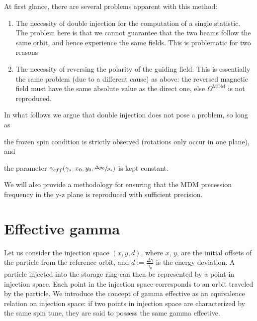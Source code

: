 \documentclass{article}
\newcommand{\W}{\Omega}
\newcommand{\MDM}{^\mathrm{MDM}}
\begin{document}
At first glance, there are several problems apparent with this method:
\begin{enumerate}
\item The necessity of double injection for the computation of a single statistic. The problem here is that we cannot guarantee that the two beams follow the same orbit, and hence experience the same fields. This is problematic for two reasons \label{itm:Injection}
  
  \item The necessity of reversing the polarity of the guiding field. This is essentially the same problem (due to a different cause) as above: the reversed magnetic field must have the same absolute value as the direct one, else $\W\MDM$ is not reproduced. \label{itm:Polarity}
\end{enumerate}

In what follows we argue that double injection does not pose a problem, so long as 
\begin{inparaenum}[a)]
\item the frozen spin condition is strictly observed (rotations only occur in one plane), and
\item the parameter $\gamma_{eff}(\gamma_s, x_0, y_0, \sfrac{\Delta p_0}{p_s})$ is kept constant.
\end{inparaenum}
We will also provide a methodology for ensuring that the MDM precession frequency in the y-z plane is reproduced with sufficient precision.

\section{Effective gamma}
Let us consider the injection space $(x,y,d)$, where $x$, $y$, are the initial offsets of the particle from the reference orbit, and $d := \frac{\Delta\gamma}{\gamma_0}$ is the energy deviation. A particle injected into the storage ring can then be represented by a point in injection space. Each point in the injection space corresponds to an orbit traveled by the particle. We introduce the concept of gamma effective as an equivalence relation on injection space: if two points in injection space are characterized by the same spin tune, they are said to possess the same gamma effective. 
\end{document}
